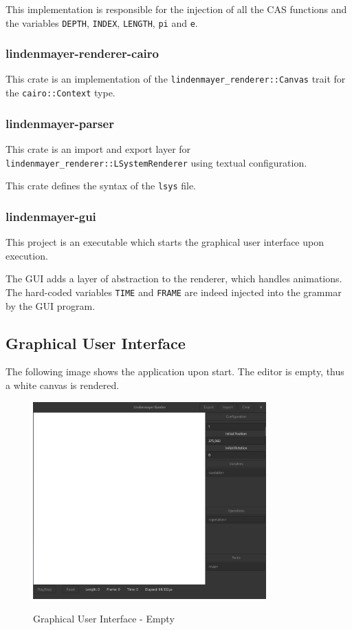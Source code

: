 \documentclass[a4paper]{article}
\begin{document}
This implementation is responsible for the injection of all the \gls{CAS} functions
and the variables \texttt{DEPTH}, \texttt{INDEX}, \texttt{LENGTH}, \texttt{pi} and \texttt{e}.

\subsubsection{lindenmayer-renderer-cairo}

This crate is an implementation of the \texttt{lindenmayer\_renderer::Canvas}
\gls{trait} for the \texttt{cairo::Context} type.

\subsubsection{lindenmayer-parser}

This crate is an import and export layer for \texttt{lindenmayer\_renderer::LSystemRenderer}
using textual configuration.

This crate defines the syntax of the \texttt{lsys} file.

\subsubsection{lindenmayer-gui}

This project is an executable which starts the graphical user interface upon execution.

The \gls{GUI} adds a layer of abstraction to the renderer, which handles animations. \\
The hard-coded variables \texttt{TIME} and \texttt{FRAME} are indeed injected into the grammar
by the \gls{GUI} program.

\pagebreak

\subsection{Graphical User Interface}

The following image shows the application upon start. The editor is empty, thus a white canvas is rendered.

\begin{figure}[h]
    \centering
    \includegraphics[width=0.8\textwidth]{media/gui/gui-empty.png}
    \label{fig:whitecanvas}
    \caption{Graphical User Interface - Empty}
\end{figure}
\end{document}
